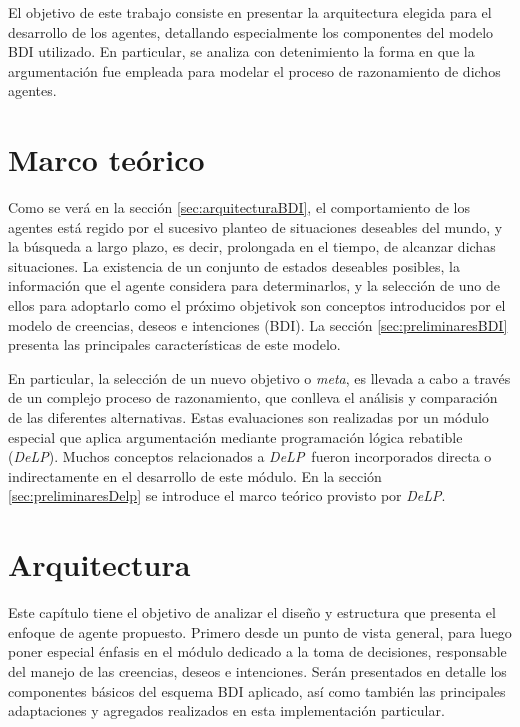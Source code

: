 \documentclass[oneside]{book}
\theoremstyle{definition}
\newcommand{\DLP}{\mbox{\textit{DeLP}}}
\begin{document}
El objetivo de este trabajo consiste en presentar la arquitectura elegida para el 
desarrollo de los agentes, detallando especialmente los componentes del modelo BDI 
utilizado. En particular, se analiza con detenimiento la forma en que la argumentación 
fue empleada para modelar el proceso de razonamiento de dichos agentes.
	


\chapter{Marco teórico}

Como se verá en la sección \ref{sec:arquitecturaBDI}, el comportamiento de los 
agentes está regido por el sucesivo planteo de situaciones deseables del 
mundo, y la búsqueda a largo plazo, es decir, prolongada en el tiempo, de 
alcanzar dichas situaciones. La existencia de un conjunto de estados deseables 
posibles, la información que el agente considera para determinarlos, y la 
selección de uno de ellos para adoptarlo como el próximo objetivok son 
conceptos introducidos por el modelo de creencias, deseos e intenciones (BDI). 
La sección \ref{sec:preliminaresBDI} presenta las principales características 
de este modelo. 

En particular, la selección de un nuevo objetivo o \textit{meta}, es llevada a cabo
a través de un complejo proceso de razonamiento, que conlleva el análisis y comparación 
de las diferentes alternativas. Estas evaluaciones son realizadas por un módulo especial
que aplica argumentación mediante programación lógica rebatible (\DLP). Muchos conceptos
relacionados a \DLP\ fueron incorporados directa o indirectamente en el desarrollo de este
módulo. En la sección \ref{sec:preliminaresDelp} se introduce el marco teórico provisto
por \DLP.






\chapter{Arquitectura} %

Este capítulo tiene el objetivo de analizar el diseño y estructura que presenta el 
enfoque de agente propuesto. Primero desde un punto de vista general, para luego 
poner especial énfasis en el módulo dedicado a la toma de decisiones, responsable 
del manejo de las creencias, deseos e intenciones. Serán presentados en detalle los 
componentes básicos del esquema BDI aplicado, así como también las principales 
adaptaciones y agregados realizados en esta implementación particular.
\end{document}
